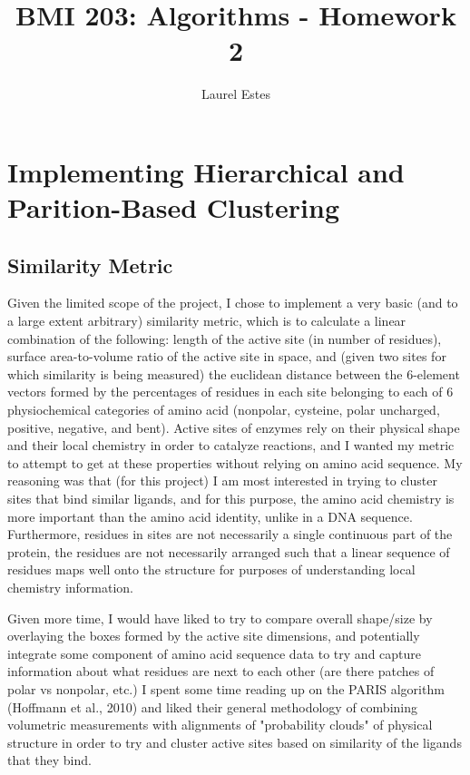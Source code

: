 \documentclass{article}
\begin{document}
\title{BMI 203: Algorithms - Homework 2}
\author{Laurel Estes}
\maketitle
\section{Implementing Hierarchical and Parition-Based Clustering}
\subsection{Similarity Metric}
Given the limited scope of the project, I chose to implement a very basic (and to a large extent arbitrary) similarity metric, which is to calculate a linear combination of the following: length of the active site (in number of residues), surface area-to-volume ratio of the active site in space, and (given two sites for which similarity is being measured) the euclidean distance between the 6-element vectors formed by the percentages of residues in each site belonging to each of 6 physiochemical categories of amino acid (nonpolar, cysteine, polar uncharged, positive, negative, and bent). Active sites of enzymes rely on their physical shape and their local chemistry in order to catalyze reactions, and I wanted my metric to attempt to get at these properties without relying on amino acid sequence. My reasoning was that (for this project) I am most interested in trying to cluster sites that bind similar ligands, and for this purpose, the amino acid chemistry is more important than the amino acid identity, unlike in a DNA sequence. Furthermore, residues in sites are not necessarily a single continuous part of the protein, the residues are not necessarily arranged such that a linear sequence of residues maps well onto the structure for purposes of understanding local chemistry information. \par
Given more time, I would have liked to try to compare overall shape/size by overlaying the boxes formed by the active site dimensions, and potentially integrate some component of amino acid sequence data to try and capture information about what residues are next to each other (are there patches of polar vs nonpolar, etc.) I spent some time reading up on the PARIS algorithm (Hoffmann et al., 2010) and liked their general methodology of combining volumetric measurements with alignments of "probability clouds" of physical structure in order to try and cluster active sites based on similarity of the ligands that they bind. \par
\end{document}
